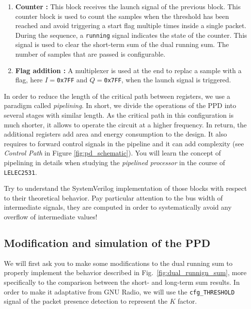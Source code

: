 \begin{enumerate}
    \item \textbf{Counter :} This block receives the launch signal of the previous block. This counter block is used to count the samples when the threshold has been reached and avoid triggering a start flag multiple times inside a single packet. During the sequence, a \texttt{running} signal indicates the state of the counter. This signal is used to clear the short-term sum of the dual running sum. The number of samples that are passed is configurable.

    \item \textbf{Flag addition :} A multiplexer is used at the end to replac a sample with a flag, here $I=$\texttt{0x7FF} and $Q=$\texttt{0x7FF}, when the launch signal is triggered.

\end{enumerate}


In order to reduce the length of the critical path between registers, we use a paradigm called \textit{pipelining}. In short, we divide the operations of the PPD into several stages with similar length. As the critical path in this configuration is much shorter, it allows to operate the circuit at a higher frequency. In return, the additional registers add area and energy consumption to the design. It also requires to forward control signals in the pipeline and it can add complexity (see \textit{Control Path} in Figure \ref{fig:pd_schematic}). You will learn the concept of pipelining in details when studying the \textit{pipelined processor} in the course of \texttt{LELEC2531}.

Try to understand the SystemVerilog implementation of those blocks with respect to their theoretical behavior. Pay particular attention to the bus width of intermediate signals, they are computed in order to systematically avoid any overflow of intermediate values!


\subsection{Modification and simulation of the PPD}


We will first ask you to make some modifications to the dual running sum to properly implement the behavior described in Fig.~\ref{fig:dual_runnign_sum}, more specifically to the comparison between the short- and long-term sum results. In order to make it adaptative from GNU Radio, we will use the \texttt{cfg\_THRESHOLD} signal of the packet presence detection to represent the $K$ factor.

